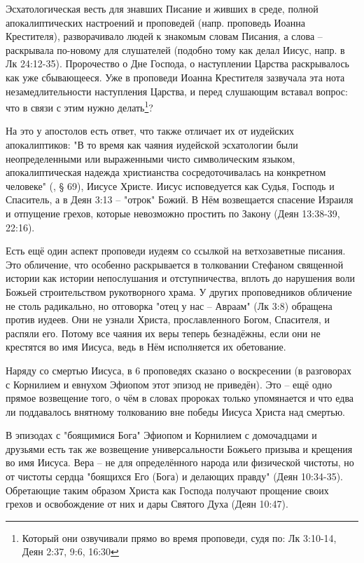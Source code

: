 Эсхатологическая весть для знавших Писание и живших в среде, полной апокалиптических настроений и проповедей (напр. проповедь Иоанна Крестителя), разворачивало людей к знакомым словам Писания, а слова – раскрывала по-новому для слушателей (подобно тому как делал Иисус, напр. в Лк 24:12-35).
Пророчество о Дне Господа, о наступлении Царства раскрывалось как уже сбывающееся.
Уже в проповеди Иоанна Крестителя зазвучала эта нота незамедлительности наступления Царства, и перед слушающим вставал вопрос: что в связи с этим нужно делать\footnote{Который они озвучивали прямо во время проповеди, судя по: Лк 3:10-14, Деян 2:37, 9:6, 16:30}?


На это у апостолов есть ответ, что также отличает их от иудейских апокалиптиков: "В то время как чаяния иудейской эсхатологии были неопределенными или выраженными чисто символическим языком, апокалиптическая надежда христианства сосредоточивалась на конкретном человеке" (\cite{@dunn.edinstvo}, § 69), Иисусе Христе.
Иисус исповедуется как Судья, Господь и Спаситель, а в Деян 3:13 – "отрок" Божий.
В Нём возвещается спасение Израиля и отпущение грехов, которые невозможно простить по Закону (Деян 13:38-39, 22:16).


Есть ещё один аспект проповеди иудеям со ссылкой на ветхозаветные писания.
Это обличение, что особенно раскрывается в толковании Стефаном священной истории как истории непослушания и отступничества, вплоть до нарушения воли Божьей строительством рукотворного храма.
У других проповедников обличение не столь радикально, но отговорка "отец у нас – Авраам" (Лк 3:8) обращена против иудеев.
Они не узнали Христа, прославленного Богом, Спасителя, и распяли его.
Потому все чаяния их веры теперь безнадёжны, если они не крестятся во имя Иисуса, ведь в Нём исполняется их обетование.


Наряду со смертью Иисуса, в 6 проповедях сказано о воскресении (в разговорах с Корнилием и евнухом Эфиопом этот эпизод не приведён).
Это – ещё одно прямое возвещение того, о чём в словах пророках только упомянается и что едва ли поддавалось внятному толкованию вне победы Иисуса Христа над смертью.


В эпизодах с "боящимися Бога" Эфиопом и Корнилием с домочадцами и друзьями есть так же возвещение универсальности Божьего призыва и крещения во имя Иисуса.
Вера – не для определённого народа или физической чистоты, но от чистоты сердца "боящихся Его (Бога) и делающих правду" (Деян 10:34-35).
Обретающие таким образом Христа как Господа получают прощение своих грехов и освобождение от них и дары Святого Духа (Деян 10:47).





